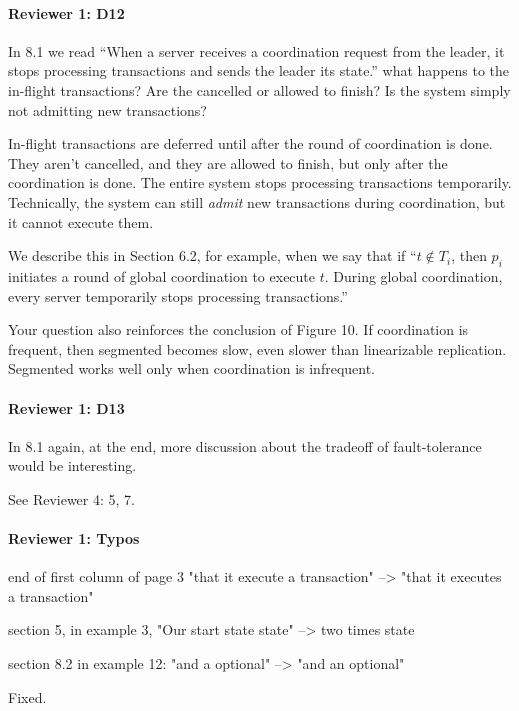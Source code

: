 \documentclass[9pt]{article}
\begin{document}
\begin{multicols*}{2}
\paragraph{Reviewer 1: D12}
\begin{feedback}
  In 8.1 we read ``When a server receives a coordination request from the
  leader, it stops processing transactions and sends the leader its state.''
  what happens to the in-flight transactions? Are the cancelled or allowed to
  finish? Is the system simply not admitting new transactions?
\end{feedback}
In-flight transactions are deferred until after the round of coordination is
done. They aren't cancelled, and they are allowed to finish, but only after the
coordination is done. The entire system stops processing transactions
temporarily.  Technically, the system can still \emph{admit} new transactions
during coordination, but it cannot execute them.

We describe this in Section 6.2, for example, when we say that if ``$t \notin
T_i$, then $p_i$ initiates a round of global coordination to execute $t$.
During global coordination, every server temporarily stops processing
transactions.''

Your question also reinforces the conclusion of Figure 10. If coordination is
frequent, then segmented \invariantconfluence{} becomes slow, even slower than
linearizable replication. Segmented \invariantconfluent{} works well only when
coordination is infrequent.

\paragraph{Reviewer 1: D13}
\begin{feedback}
  In 8.1 again, at the end, more discussion about the tradeoff of
  fault-tolerance would be interesting.
\end{feedback}
See Reviewer 4: 5, 7.

\paragraph{Reviewer 1: Typos}
\begin{feedback}
  end of first column of page 3 "that it execute a transaction" --> "that it
  executes a transaction"

  section 5, in example 3, "Our start state state" --> two times state

  section 8.2 in example 12: "and a optional" --> "and an optional"
\end{feedback}
Fixed.


\end{multicols*}
\end{document}
